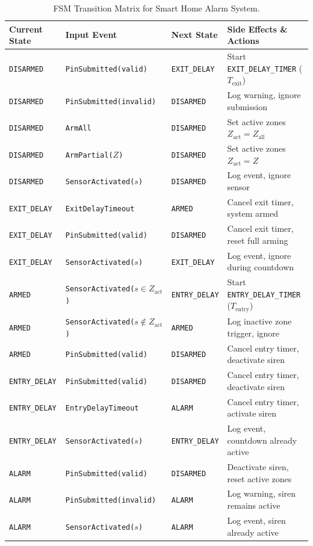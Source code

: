 \documentclass[11pt,a4paper]{article}
\begin{document}
\begin{table}[h]
\centering
\footnotesize
\caption{FSM Transition Matrix for Smart Home Alarm System.}
\label{tab:shas-fsm}
\begin{tabularx}{\textwidth}{l l l >{\raggedright\arraybackslash}X}
\toprule
\textbf{Current State} & \textbf{Input Event} & \textbf{Next State} & \textbf{Side Effects \& Actions} \\
\midrule
\texttt{DISARMED} & \texttt{PinSubmitted(valid)} & \texttt{EXIT\_DELAY} & Start \texttt{EXIT\_DELAY\_TIMER} ($T_{\text{exit}}$) \\
\texttt{DISARMED} & \texttt{PinSubmitted(invalid)} & \texttt{DISARMED} & Log warning, ignore submission \\
\texttt{DISARMED} & \texttt{ArmAll} & \texttt{DISARMED} & Set active zones $Z_{\text{act}} = Z_{\text{all}}$ \\
\texttt{DISARMED} & \texttt{ArmPartial($Z$)} & \texttt{DISARMED} & Set active zones $Z_{\text{act}} = Z$ \\
\texttt{DISARMED} & \texttt{SensorActivated($s$)} & \texttt{DISARMED} & Log event, ignore sensor \\
\midrule
\texttt{EXIT\_DELAY} & \texttt{ExitDelayTimeout} & \texttt{ARMED} & Cancel exit timer, system armed \\
\texttt{EXIT\_DELAY} & \texttt{PinSubmitted(valid)} & \texttt{DISARMED} & Cancel exit timer, reset full arming \\
\texttt{EXIT\_DELAY} & \texttt{SensorActivated($s$)} & \texttt{EXIT\_DELAY} & Log event, ignore during countdown \\
\midrule
\texttt{ARMED} & \texttt{SensorActivated($s \in Z_{\text{act}}$)} & \texttt{ENTRY\_DELAY} & Start \texttt{ENTRY\_DELAY\_TIMER} ($T_{\text{entry}}$) \\
\texttt{ARMED} & \texttt{SensorActivated($s \notin Z_{\text{act}}$)} & \texttt{ARMED} & Log inactive zone trigger, ignore \\
\texttt{ARMED} & \texttt{PinSubmitted(valid)} & \texttt{DISARMED} & Cancel entry timer, deactivate siren \\
\midrule
\texttt{ENTRY\_DELAY} & \texttt{PinSubmitted(valid)} & \texttt{DISARMED} & Cancel entry timer, deactivate siren \\
\texttt{ENTRY\_DELAY} & \texttt{EntryDelayTimeout} & \texttt{ALARM} & Cancel entry timer, activate siren \\
\texttt{ENTRY\_DELAY} & \texttt{SensorActivated($s$)} & \texttt{ENTRY\_DELAY} & Log event, countdown already active \\
\midrule
\texttt{ALARM} & \texttt{PinSubmitted(valid)} & \texttt{DISARMED} & Deactivate siren, reset active zones \\
\texttt{ALARM} & \texttt{PinSubmitted(invalid)} & \texttt{ALARM} & Log warning, siren remains active \\
\texttt{ALARM} & \texttt{SensorActivated($s$)} & \texttt{ALARM} & Log event, siren already active \\
\bottomrule
\end{tabularx}
\end{table}
\end{document}
